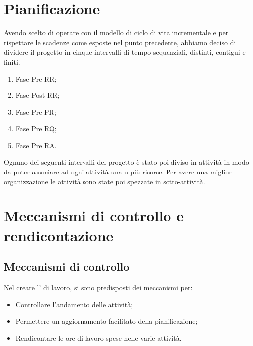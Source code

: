 \newpage


\section{Pianificazione}
\label{3.0}
Avendo scelto di operare con il modello di ciclo di vita incrementale e per rispettare le scadenze come esposte nel punto precedente, abbiamo deciso di dividere il progetto in cinque intervalli di tempo sequenziali, distinti, contigui e finiti.

\begin{enumerate}
\item Fase Pre RR;
\item Fase Post RR;
\item Fase Pre PR;
\item Fase Pre RQ;
\item Fase Pre RA.
\end{enumerate}

Ognuno dei seguenti intervalli del progetto è stato poi diviso in attività in modo da poter associare ad ogni attività una o più risorse. Per avere una miglior organizzazione le attività sono state poi spezzate in sotto-attività.



\newpage


\newpage


\newpage


\newpage


\newpage


\newpage


\newpage

\section{Meccanismi di controllo e rendicontazione}
\subsection{Meccanismi di controllo}
Nel creare l' di lavoro, si sono predisposti dei meccanismi per:
\begin{itemize}
\item Controllare l'andamento delle attività;
\item Permettere un aggiornamento facilitato della pianificazione;
\item Rendicontare le ore di lavoro spese nelle varie attività.
\end{itemize}
